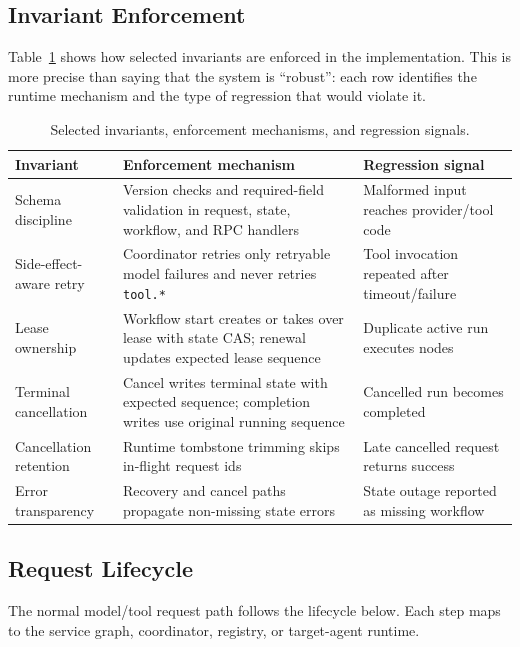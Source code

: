 \documentclass[manuscript,screen,review]{acmart}
\begin{document}
\subsection{Invariant Enforcement}

Table~\ref{tab:invariant-enforcement} shows how selected invariants are enforced
in the implementation. This is more precise than saying that the system is
``robust'': each row identifies the runtime mechanism and the type of regression
that would violate it.

\begin{table}[t]
\caption{Selected invariants, enforcement mechanisms, and regression signals.}
\label{tab:invariant-enforcement}
\centering
\begin{tabular}{p{}p{}p{}}
\toprule
Invariant & Enforcement mechanism & Regression signal \\
\midrule
Schema discipline & Version checks and required-field validation in request,
state, workflow, and RPC handlers & Malformed input reaches provider/tool code \\
Side-effect-aware retry & Coordinator retries only retryable model failures and
never retries \texttt{tool.*} & Tool invocation repeated after timeout/failure \\
Lease ownership & Workflow start creates or takes over lease with state CAS;
renewal updates expected lease sequence & Duplicate active run executes nodes \\
Terminal cancellation & Cancel writes terminal state with expected sequence;
completion writes use original running sequence & Cancelled run becomes completed \\
Cancellation retention & Runtime tombstone trimming skips in-flight request ids
& Late cancelled request returns success \\
Error transparency & Recovery and cancel paths propagate non-missing state
errors & State outage reported as missing workflow \\
\bottomrule
\end{tabular}
\end{table}

\subsection{Request Lifecycle}

The normal model/tool request path follows the lifecycle below. Each step maps
to the service graph, coordinator, registry, or target-agent runtime.
\end{document}
